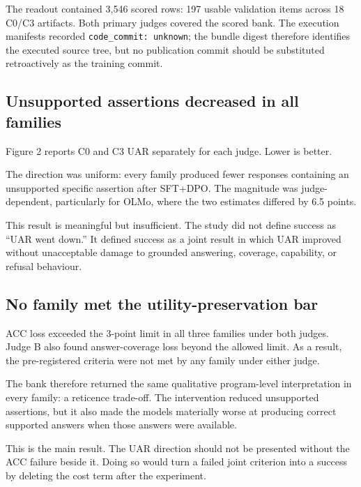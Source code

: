 \documentclass[9pt,letterpaper,twocolumn]{extarticle}
\begin{document}
The readout contained 3,546 scored rows: 197 usable validation items
across 18 C0/C3 artifacts. Both primary judges covered the scored bank.
The execution manifests recorded \texttt{code\_commit:\ unknown}; the
bundle digest therefore identifies the executed source tree, but no
publication commit should be substituted retroactively as the training
commit.

\subsection{Unsupported assertions decreased in all
families}\label{unsupported-assertions-decreased-in-all-families}

Figure 2 reports C0 and C3 UAR separately for each judge. Lower is
better.





The direction was uniform: every family produced fewer responses
containing an unsupported specific assertion after SFT+DPO. The
magnitude was judge-dependent, particularly for OLMo, where the two
estimates differed by 6.5 points.

This result is meaningful but insufficient. The study did not define
success as ``UAR went down.'' It defined success as a joint result in
which UAR improved without unacceptable damage to grounded answering,
coverage, capability, or refusal behaviour.

\subsection{No family met the utility-preservation
bar}\label{no-family-met-the-utility-preservation-bar}

ACC loss exceeded the 3-point limit in all three families under both
judges. Judge B also found answer-coverage loss beyond the allowed
limit. As a result, the pre-registered criteria were not met by any
family under either judge.

The bank therefore returned the same qualitative program-level
interpretation in every family: a reticence trade-off. The intervention
reduced unsupported assertions, but it also made the models materially
worse at producing correct supported answers when those answers were
available.

This is the main result. The UAR direction should not be presented
without the ACC failure beside it. Doing so would turn a failed joint
criterion into a success by deleting the cost term after the experiment.
\end{document}
